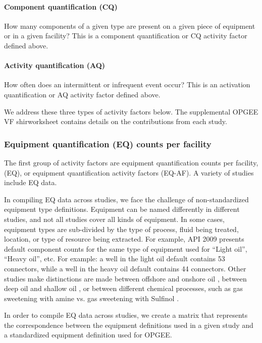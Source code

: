 \documentclass[11pt]{report}
\begin{document}
\paragraph{Component quantification (CQ)} How many components of a given type are present on a given piece of equipment or in a given facility? This is a component quantification or CQ activity factor defined above.

\paragraph{Activity quantification (AQ)} How often does an intermittent or infrequent event occur? This is an activation quantification or AQ activity factor defined above.

We address these three types of activity factors below. The supplemental OPGEE VF shirworksheet contains details on the contributions from each study.

\subsubsection{Equipment quantification (EQ) counts per facility}
The first group of activity factors are equipment quantification counts per facility, (EQ), or equipment quantification activity factors (EQ-AF). A variety of studies include EQ data. 

In compiling EQ data across studies, we face the challenge of non-standardized equipment type definitions.  Equipment can be named differently in different studies, and not all studies cover all kinds of equipment.  In some cases, equipment types are sub-divided by the type of process, fluid being treated, location, or type of resource being extracted. For example, API 2009 \cite[Appendix B]{Shires2009}presents default component counts for the same type of equipment used for ``Light oil'', ``Heavy oil'', etc.  For example: a well in the light oil default contains 53 connectors, while a well in the heavy oil default contains 44 connectors.  Other studies make distinctions are made between offshore and onshore oil \cite{API1993a, Shires2009, EPA1996}, between deep oil and shallow oil \cite{CAPP2014}, or between different chemical processes, such as gas sweetening with amine vs. gas sweetening with Sulfinol \cite{CAPP2014}.

In order to compile EQ data across studies, we create a matrix that represents the correspondence between the equipment definitions used in a given study and a standardized equipment definition used for OPGEE.  
\end{document}
